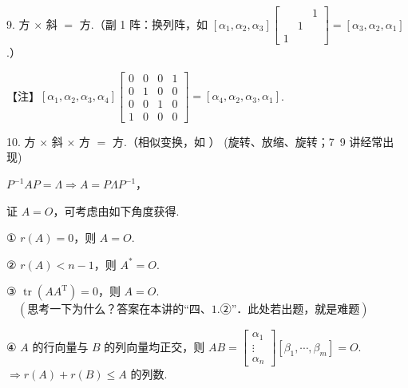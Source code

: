 9. 方 $\times$ 斜 $=$ 方.（副 1 阵：换列阵，如 $[\alpha_1,\alpha_2,\alpha_3]\begin{bmatrix}&&1\\&1&\\1&&\end{bmatrix}=[\alpha_3,\alpha_2,\alpha_1]$ .）

\begin{fnote}
【注】$[\alpha_1,\alpha_2,\alpha_3,\alpha_4]\begin{bmatrix}0&0&0&1\\0&1&0&0\\0&0&1&0\\1&0&0&0\end{bmatrix}=[\alpha_4,\alpha_2,\alpha_3,\alpha_1]$.
\end{fnote}

10. 方 $\times$ 斜 $\times$ 方 $=$ 方.（相似变换，如
）
\quad (旋转、放缩、旋转；7~9 讲经常出现)

$P^{-1}AP=\Lambda\Rightarrow A=P\Lambda P^{-1}$，


证 $A=O$，可考虑由如下角度获得.

① $r(A)=0$，则 $A=O$.

② $r(A)<n-1$，则 $A^*=O$.

③ $\operatorname{tr}(AA^{\mathrm T})=0$，则 $A=O$. $\quad(\text{思考一下为什么？答案在本讲的“四、1.②”．此处若出题，就是难题})$

④ $A$ 的行向量与 $B$ 的列向量均正交，则 $AB=\begin{bmatrix}\alpha_1\\\vdots\\\alpha_n\end{bmatrix}[\beta_1,\cdots,\beta_m]=O$. $\Rightarrow r(A)+r(B)\le A$ 的列数.

